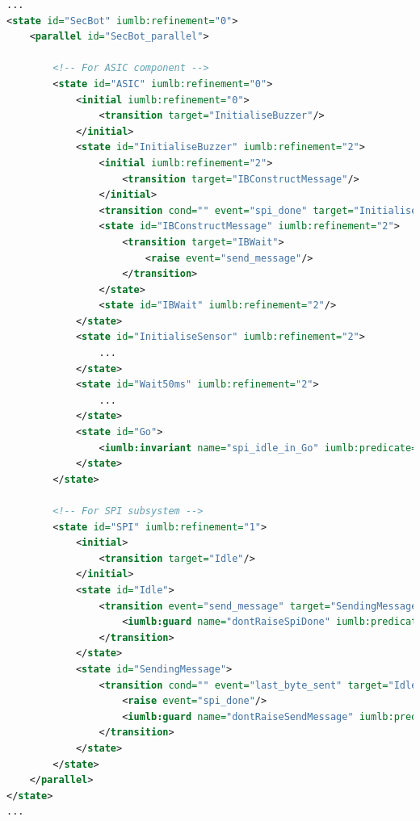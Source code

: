 \begin{lstlisting}[caption=Snippet for SCXML representation of SecBot model,label={lst:secBot}, language=xml]
...
<state id="SecBot" iumlb:refinement="0">
    <parallel id="SecBot_parallel">

     	<!-- For ASIC component -->
    	<state id="ASIC" iumlb:refinement="0">
        	<initial iumlb:refinement="0">
          		<transition target="InitialiseBuzzer"/>
        	</initial>
        	<state id="InitialiseBuzzer" iumlb:refinement="2">
        		<initial iumlb:refinement="2">
	            	<transition target="IBConstructMessage"/>
	          	</initial>
          		<transition cond="" event="spi_done" target="InitialiseSensor"/>
          		<state id="IBConstructMessage" iumlb:refinement="2">
	            	<transition target="IBWait">
	              		<raise event="send_message"/>
	            	</transition>
          		</state>
          		<state id="IBWait" iumlb:refinement="2"/>
        	</state>
       		<state id="InitialiseSensor" iumlb:refinement="2">
        		...
        	</state>
        	<state id="Wait50ms" iumlb:refinement="2">
          		...
        	</state>
        	<state id="Go">
          		<iumlb:invariant name="spi_idle_in_Go" iumlb:predicate="Idle = TRUE" iumlb:refinement="1"/>
        	</state>
      	</state>

      	<!-- For SPI subsystem -->
      	<state id="SPI" iumlb:refinement="1">
	        <initial>
	        	<transition target="Idle"/>
	        </initial>
	        <state id="Idle">
				<transition event="send_message" target="SendingMessage">
					<iumlb:guard name="dontRaiseSpiDone" iumlb:predicate="spi_done ∉ SCXML_raisedTriggers" iumlb:refinement="1"/>
				</transition>
        	</state>
			<state id="SendingMessage">
				<transition cond="" event="last_byte_sent" target="Idle">
					<raise event="spi_done"/>
					<iumlb:guard name="dontRaiseSendMessage" iumlb:predicate="send_message ∉ SCXML_raisedTriggers" iumlb:refinement="1"/>
				</transition>
			</state>
		</state>
	</parallel>
</state>
...
\end{lstlisting}




